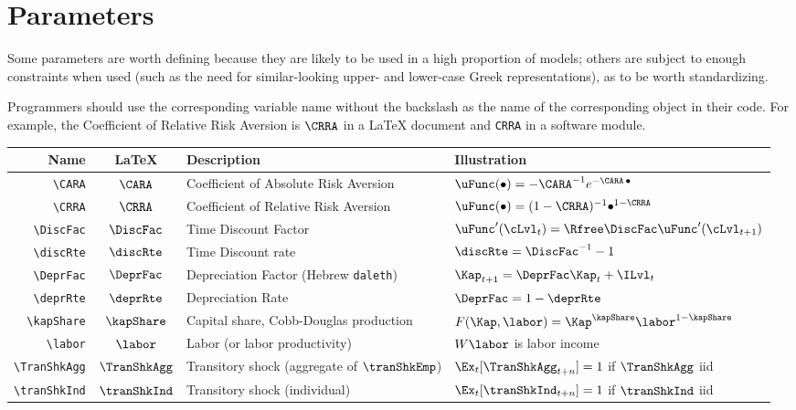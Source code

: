 \documentclass{econark}
\begin{document}
\section{Parameters}
Some parameters are worth defining because they are likely to be
used in a high proportion of models; others are subject to enough
constraints when used (such as the need for similar-looking upper-
and lower-case Greek representations), as to be worth standardizing.

Programmers should
use the corresponding variable name without the backslash as the name of the corresponding object
in their code.  For example, the Coefficient of Relative Risk Aversion is $\verb|\CRRA|$ in a \LaTeX{}
document and \texttt{CRRA} in a software module.

\hypertarget{Parameters}{}
\begin{table}[ht]
  \centering
  \begin{tabular}{|>{\ttfamily}rcll|}
    \hline
    Name                   & \LaTeX         & Description & Illustration
    \\ \hline
    \verb|\CARA|           & $\CARA$       & Coefficient of Absolute Risk Aversion &$\uFunc(\bullet)=-\CARA^{-1} e^{-\CARA\,\bullet}$
    \\ \verb|\CRRA|        & $\CRRA$       & Coefficient of Relative Risk Aversion & $\uFunc(\bullet)=(1-\CRRA)^{-1}\bullet^{1-\CRRA}$
    \\ \verb|\DiscFac|     & $\DiscFac$    & Time Discount Factor & $\uFunc^{\prime}(\cLvl_{t}) =  \Rfree \DiscFac \uFunc^{\prime}(\cLvl_{t+1})$
    \\ \verb|\discRte|     & $\discRte$    & Time Discount rate & $\discRte=\DiscFac^{-1}-1$
    \\ \verb|\DeprFac|     & $\DeprFac$    & Depreciation Factor (Hebrew \texttt{daleth}) & $\Kap_{t+1} = \DeprFac \Kap_{t}+\ILvl_{t}$
    \\ \verb|\deprRte|     & $\deprRte$    & Depreciation Rate & $\DeprFac = 1-\deprRte$
    \\ \verb|\kapShare|    & $\kapShare$   & Capital share, Cobb-Douglas production & $F(\Kap,\labor)=\Kap^{\kapShare}\labor^{1-\kapShare}$
    \\ \verb|\labor|       & $\labor$      & Labor (or labor productivity) & $W\labor$ is labor income
    \\ \verb|\TranShkAgg|  & $\TranShkAgg$ & Transitory shock (aggregate of $\tranShkEmp$) & $\Ex_{t}[\TranShkAgg_{t+n}]=1$ if $\TranShkAgg$ iid
    \\ \verb|\tranShkInd|  & $\tranShkInd$ & Transitory shock (individual) &  $\Ex_{t}[\tranShkInd_{t+n}]=1$ if $\tranShkInd$ iid

\end{tabular}
\end{table}
\end{document}
